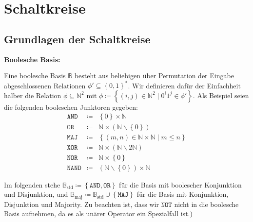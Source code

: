 
\chapter{Schaltkreise}

\section{Grundlagen der Schaltkreise}
\begin{defn}
\textbf{Boolesche Basis:} 

Eine boolesche Basis $\mathbb{B}$ besteht aus beliebigen über Permutation
der Eingabe abgeschlossenen Relationen $\phi'\subseteq\left\{ 0,1\right\} ^{*}$.
Wir definieren dafür der Einfachheit halber die Relation $\phi\subseteq\mathbb{N}^{2}$
mit $\phi\coloneqq\left\{ \left(i,j\right)\in\mathbb{N}^{2}\mid0^{i}1^{j}\in\phi'\right\} $.
Als Beispiel seien die folgenden booleschen Junktoren gegeben: 
\begin{eqnarray*}
\mathtt{AND} & \coloneqq & \left\{ 0\right\} \times\mathbb{N}\\
\mathtt{OR} & \coloneqq & \mathbb{N}\times\left(\mathbb{N}\backslash\left\{ 0\right\} \right)\\
\mathtt{MAJ} & \coloneqq & \left\{ \left(m,n\right)\in\mathbb{N}\times\mathbb{N}\mid m\leqslant n\right\} \\
\mathtt{XOR} & \coloneqq & \mathbb{N}\times\left(\mathbb{N}\backslash2\mathbb{N}\right)\\
\mathtt{NOR} & \coloneqq & \mathbb{N}\times\left\{ 0\right\} \\
\mathtt{NAND} & \coloneqq & \left(\mathbb{N}\backslash\left\{ 0\right\} \right)\times\mathbb{N}
\end{eqnarray*}

Im folgenden stehe $\mathbb{B}_{\mathrm{std}}\coloneqq\left\{ \mathtt{AND},\mathtt{OR}\right\} $
für die Basis mit boolescher Konjunktion und Disjunktion, und $\mathbb{B}_{\mathrm{maj}}\coloneqq\mathbb{B}_{\mathrm{std}}\cup\left\{ \mathtt{MAJ}\right\} $
für die Basis mit Konjunktion, Disjunktion und Majority. Zu beachten
ist, dass wir $\mathtt{NOT}$ nicht in die boolesche Basis aufnehmen,
da es als unärer Operator ein Spezialfall ist.)
\end{defn}
%
